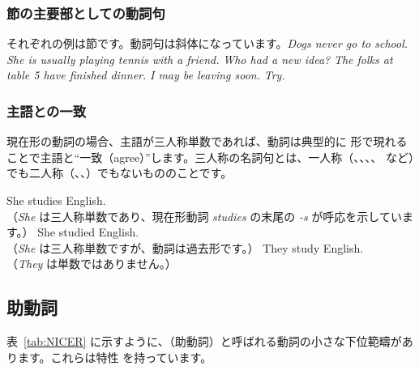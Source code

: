 \subsubsection*{節の主要部としての動詞句}
\label{sec:VPs_head_clauses}
それぞれの例は節です。動詞句は斜体になっています。\textit{Dogs \emph{never go to school}.}  \textit{She is \emph{usually playing tennis with a friend}.} \textit{Who \emph{had a new idea}?} \textit{The folks at table 5 \emph{have finished dinner}.} \textit{I \emph{may be leaving soon}.} \textit{\emph{Try.}}

\subsubsection*{主語との一致}\label{sec:agreement}
現在形の動詞の場合、主語が三人称単数であれば、動詞は典型的に  形で現れることで主語と\enquote{一致（agree）}します。三人称の名詞句とは、一人称（、、、、 など）でも二人称（、、）でもないもののことです。

\ea
    \ea She studies English.\\（\emph{She} は三人称単数であり、現在形動詞 \emph{studies} の末尾の \emph{-s} が呼応を示しています。）
    \ex She studied English.\\（\emph{She} は三人称単数ですが、動詞は過去形です。）
    \ex They study English.\\（\emph{They} は単数ではありません。）
    \z
\z{}

\subsection{助動詞}\label{sec:aux}

表~\ref{tab:NICER} に示すように、（助動詞）と呼ばれる動詞の小さな下位範疇があります。これらは特性 \citep{sag2019} を持っています。

